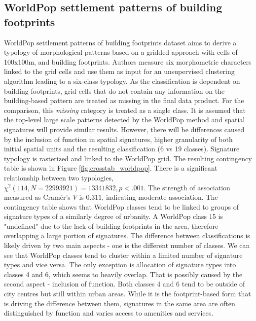 \documentclass[fleqn,10pt]{wlscirep}
\begin{document}
\subsection*{WorldPop settlement patterns of building footprints}
WorldPop settlement patterns of building footprints dataset aims to derive a typology of
morphological patterns based on a gridded approach with cells of
100x100m, and building footprints. Authors measure six morphometric characters
linked to the grid cells and use them as input for an unsupervised clustering
algorithm leading to a six-class typology.
As the classification is dependent on building footprints, grid cells that do
not contain any information on the building-based pattern are treated as missing in the
final data product. For the comparison, this \textit{missing}
category is treated as a single class. It is assumed that the top-level large scale
patterns detected by the WorldPop method and spatial signatures will provide similar
results. However, there will be differences caused by the inclusion of function in spatial
signatures, higher granularity of both initial spatial units and the resulting
classification (6 vs 19 classes).
Signature typology is rasterized and linked to the WorldPop grid. The resulting
contingency table is shown in Figure \ref{fig:crosstab_worldpop}. There is a significant relationship between
two typologies, $\chi^{2} (114, N = 22993921) = 13341832, p < .001$. The strength of
association measured as Cram\'{e}r's $V$ is $0.311$, indicating moderate association.
The contingency table shows that WorldPop classes tend to be linked to groups of
signature types of a similarly degree of urbanity. A WorldPop class 15 is "undefined" due
to the lack of building footprints in the area, therefore overlapping a large portion of
signatures.
The difference between classifications is likely driven by two main aspects - one is the different
number of classes. We can see that WorldPop classes tend to cluster within a limited number of
signature types and vice versa. The only exception is allocation of signature types into classes 4 and 6,
which seems to heavily overlap. That is possibly caused by the second aspect - inclusion of function. Both
classes 4 and 6 tend to be outside of city centres but still within urban areas. While it is
the footprint-based form that is driving the difference between them, signatures in the same
area are often distinguished by function and varies access to amenities and services.
\end{document}
